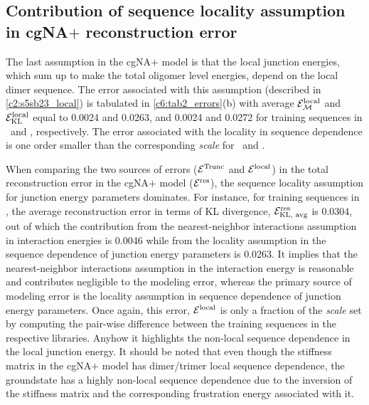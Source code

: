 \subsection{Contribution of sequence locality assumption in cgNA$+$ reconstruction error}\label{c6:locality_err_sec}
The last assumption in the cgNA$+$ model is that the local junction energies, which sum up to make the total oligomer level energies, depend on the local dimer sequence.
The error associated with this assumption (described in \cref{c2:s5sb23_local}) is tabulated in \cref{c6:tab2_errors}(b) with average ${\mathcal E}_{\mathcal{M}}^{\text{local}}$ and ${\mathcal E}_{\text{KL}}^{\text{local}}$ equal to 0.0024 and 0.0263, and 0.0024 and 0.0272 for training sequences in \Lbm \  and \Lbh, respectively. 
The error associated with the locality in sequence dependence is one order smaller than the corresponding \textit{scale} for \Lbm \ and \Lbh.

When comparing the two sources of errors (${\mathcal E}^{\text{Trunc}}$ and ${\mathcal E}^{\text{local}}$) in the total reconstruction error in the cgNA$+$ model (${\mathcal E}^{\text{res}}$), the sequence locality assumption for junction energy parameters dominates. 
For instance, for training sequences in \Lbm, the average reconstruction error in terms of KL divergence, ${\mathcal E}_{\text{KL,  avg}}^{\text{res}}$ is 0.0304, out of which the contribution from the nearest-neighbor interactions assumption in interaction energies is 0.0046 while from the locality assumption in the sequence dependence of junction energy parameters is 0.0263. 
It implies that the nearest-neighbor interactions assumption in the interaction energy is reasonable and contributes negligible to the modeling error, whereas the primary source of modeling error is the locality assumption in sequence dependence of junction energy parameters. 
Once again, this error, ${\mathcal E}^{\text{local}}$ is only a fraction of the \textit{scale} set by computing the pair-wise difference between the training sequences in the respective libraries. 
Anyhow it highlights the non-local sequence dependence in the local junction energy. 
It should be noted that even though the stiffness matrix in the cgNA$+$ model has dimer/trimer local sequence dependence, the groundstate has a highly non-local sequence dependence due to the inversion of the stiffness matrix and the corresponding frustration energy associated with it.  

